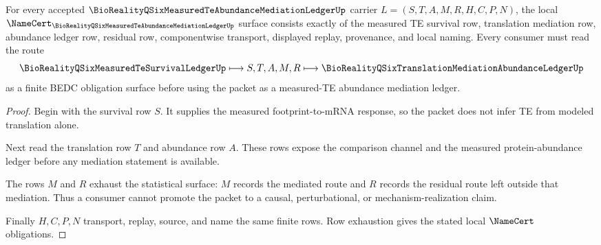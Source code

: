 \begin{theorem}
\label{thm:bioreality-q-six-measured-te-abundance-ledger-obligations}
For every accepted $\BioRealityQSixMeasuredTeAbundanceMediationLedgerUp$ carrier $L=(S,T,A,M,R,H,C,P,N)$, the local $\NameCert_{\BioRealityQSixMeasuredTeAbundanceMediationLedgerUp}$ surface consists exactly of the measured TE survival row, translation mediation row, abundance ledger row, residual row, componentwise transport, displayed replay, provenance, and local naming. Every consumer must read the route
$$
\BioRealityQSixMeasuredTeSurvivalLedgerUp
\longmapsto
S,T,A,M,R
\longmapsto
\BioRealityQSixTranslationMediationAbundanceLedgerUp
$$
as a finite BEDC obligation surface before using the packet as a measured-TE abundance mediation ledger.
\end{theorem}
\begin{proof}
Begin with the survival row $S$. It supplies the measured footprint-to-mRNA response, so the packet does not infer TE from modeled translation alone.

Next read the translation row $T$ and abundance row $A$. These rows expose the comparison channel and the measured protein-abundance ledger before any mediation statement is available.

The rows $M$ and $R$ exhaust the statistical surface: $M$ records the mediated route and $R$ records the residual route left outside that mediation. Thus a consumer cannot promote the packet to a causal, perturbational, or mechanism-realization claim.

Finally $H,C,P,N$ transport, replay, source, and name the same finite rows. Row exhaustion gives the stated local $\NameCert$ obligations.
\end{proof}
